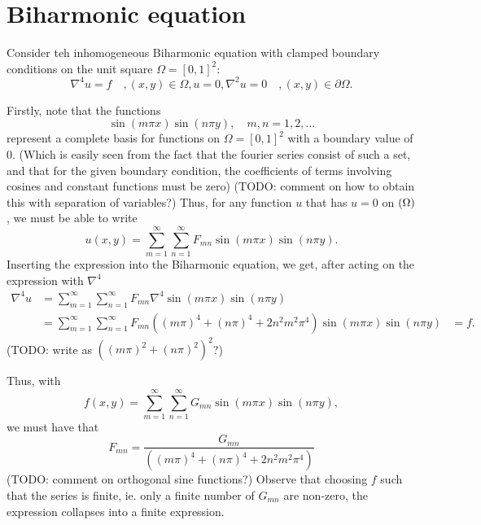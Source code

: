 \section{Biharmonic equation}
\label{sec:PDE}

\newtheorem{theorem}{Theorem}
\newtheorem{lemma}{Lemma}

Consider teh inhomogeneous Biharmonic equation with clamped boundary conditions on the unit square $\Omega = [0, 1]^2$:
\begin{subequations}\label{eq:PDE}
  \begin{equation}
    \nabla^4 u = f \quad, (x, y) \in \Omega,
  \end{equation}
  \begin{equation}
    u = 0, \nabla^2u = 0 \quad, (x, y) \in \partial\Omega.
  \end{equation}
\end{subequations}

Firstly, note that the functions
$$
\sin(m \pi x) \sin(n \pi y), \quad m,n = 1, 2, \dots
$$
represent a complete basis for functions on $\Omega = [0, 1]^2$ with a boundary value of 0.
(Which is easily seen from the fact that the fourier series consist of such a set, and that for the given boundary condition, the coefficients of terms involving cosines and constant functions must be zero)
(TODO: comment on how to obtain this with separation of variables?)
Thus, for any function $u$ that has $u = 0$ on $\del\Omega$, we must be able to write
$$
u(x, y) =
\sum_{m=1}^\infty
\sum_{n=1}^\infty
F_{mn}
\sin(m\pi x)
\sin(n\pi y).
$$
Inserting the expression into the Biharmonic equation, we get, after acting on the expression with $\nabla^4$
\begin{align}
  \nabla^4 u &=
  \sum_{m=1}^\infty
  \sum_{n=1}^\infty
  F_{mn}
  \nabla^4
  \sin(m\pi x)\sin(n\pi y)\\
  &=
  \sum_{m=1}^\infty
  \sum_{n=1}^\infty
  F_{mn}
  \left(
  (m\pi)^4 + (n\pi)^4 + 2n^2m^2\pi^4
  \right)
  \sin(m\pi x)\sin(n\pi y)
  &= f.
\end{align}
(TODO: write as $((m\pi)^2+(n\pi)^2)^2$?)

Thus, with
$$
f(x, y)
=
\sum_{m=1}^\infty
\sum_{n=1}^\infty
G_{mn}
\sin(m\pi x)\sin(n\pi y),
$$
we must have that
$$
F_{mn} =
\frac{
  G_{mn}
}{
  \left(
  (m\pi)^4 + (n\pi)^4 + 2n^2m^2\pi^4
  \right)
}
$$
(TODO: comment on orthogonal sine functions?)
Observe that choosing $f$ such that the series is finite, ie. only a finite number of $G_{mn}$ are non-zero, the expression collapses into a finite expression.

